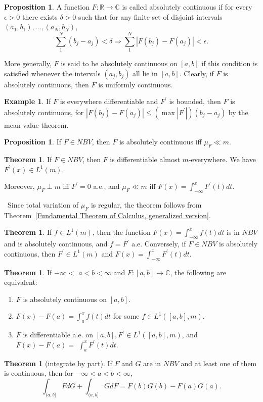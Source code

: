 \documentclass[12pt,a4paper]{book}
\newenvironment{prooff}{{\noindent\it\textcolor{cyan!40!black}{Proof}:}\,}{\par}
\newcommand{\p}{^{\prime}}
\newenvironment{enu}{\begin{enumerate}[(1)]}{\end{enumerate}}
\theoremstyle{definition}
\newtheorem{theo}[defn]{Theorem}
\newtheorem{prop}[defn]{Proposition}
\newtheorem{exam}[defn]{Example}
\begin{document}
\begin{prop}
    A function $F: \mathbb{R} \rightarrow \mathbb{C}$ is called absolutely continuous if for every $\epsilon>0$ there exists $\delta>0$ such that for any finite set of disjoint intervals $\left(a_1, b_1\right), \ldots,\left(a_N, b_N\right)$,
    $$
        \sum_1^N\left(b_j-a_j\right)<\delta \Longrightarrow \sum_1^N\left|F\left(b_j\right)-F\left(a_j\right)\right|<\epsilon .
    $$

    More generally, $F$ is said to be absolutely continuous on $[a, b]$ if this condition is satisfied whenever the intervals $\left(a_j, b_j\right)$ all lie in $[a, b]$. Clearly, if $F$ is absolutely continuous, then $F$ is uniformly continuous. 
\end{prop}
\begin{exam}
    If $F$ is everywhere differentiable and $F^{\prime}$ is bounded, then $F$ is absolutely continuous, for $\left|F\left(b_j\right)-F\left(a_j\right)\right| \leq\left(\max \left|F^{\prime}\right|\right)\left(b_j-a_j\right)$ by the mean value theorem.
\end{exam}
\begin{prop}
    If $F \in N B V$, then $F$ is absolutely continuous iff $\mu_F \ll m$.
\end{prop}
\begin{theo}
    If $F \in N B V$, then $F$ is differentiable almost $m$-everywhere.
    We have $F\p(x)\in L^1(m)$.
    
    Moreover, $\mu_F \perp m$ iff $F^{\prime}=0$ a.e., and $\mu_F \ll m$ iff $F(x)=\int_{-\infty}^x F^{\prime}(t) d t$.
\end{theo}
\begin{prooff}
    Since total variation of $\mu_F$ is regular, the theorem follows from Theorem~\ref{Fundamental Theorem of Calculus, generalized version}.
\end{prooff}
\begin{theo}
    If $f \in L^1(m)$, then the function $F(x)=\int_{-\infty}^x f(t) d t$ is in $N B V$ and is absolutely continuous, and $f=F^{\prime}$ a.e.
    Conversely, if $F \in N B V$ is absolutely continuous, then $F^{\prime} \in L^1(m)$ and $F(x)=\int_{-\infty}^x F^{\prime}(t) d t$.
\end{theo}
\begin{theo}
    If $-\infty<$ $a<b<\infty$ and $F:[a, b] \rightarrow \mathbb{C}$, the following are equivalent:
    \begin{enu}
        \item $F$ is absolutely continuous on $[a, b]$.
        \item $F(x)-F(a)=\int_a^x f(t) d t$ for some $f \in L^1([a, b], m)$.
        \item $F$ is differentiable a.e. on $[a, b], F^{\prime} \in L^1([a, b], m)$, and $F(x)-F(a)=$ $\int_a^x F^{\prime}(t) d t$.
    \end{enu}
\end{theo}
\begin{theo}[integrate by part]
    If $F$ and $G$ are in $N B V$ and at least one of them is continuous, then for $-\infty<a<b<\infty$,
    $$
        \int_{(a, b]} F d G+\int_{(a, b]} G d F=F(b) G(b)-F(a) G(a) .
    $$
\end{theo}
\end{document}
